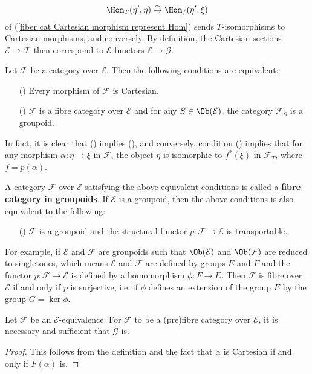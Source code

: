 \[\Hom_T(\eta',\eta)\stackrel{\sim}{\to }\Hom_f(\eta',\xi)\]
of (\ref{fiber cat Cartesian morphism represent Hom}) sends $T$-isomorphisms to Cartesian morphisms, and conversely. By definition, the Cartesian sections $\mathcal{E}\to \mathcal{F}$ then correspond to $\mathcal{E}$-functors $\mathcal{E}\to \mathcal{G}$.
\begin{example}\label{fibre cat in groupoid example}
Let $\mathcal{F}$ be a category over $\mathcal{E}$. Then the following conditions are equivalent:
\begin{enumerate}
\item[(\rmnum{1})] Every morphism of $\mathcal{F}$ is Cartesian.
\item[(\rmnum{2})] $\mathcal{F}$ is a fibre category over $\mathcal{E}$ and for any $S\in\Ob(\mathcal{E})$, the category $\mathcal{F}_S$ is a groupoid.
\end{enumerate}
In fact, it is clear that () implies (), and conversely, condition () implies that for any morphism $\alpha:\eta\to \xi$ in $\mathcal{F}$, the object $\eta$ is isomorphic to $f^*(\xi)$ in $\mathcal{F}_T$, where $f=p(\alpha)$.\par
A category $\mathcal{F}$ over $\mathcal{E}$ satisfying the above equivalent conditions is called a \textbf{fibre category in groupoids}. If $\mathcal{E}$ is a groupoid, then the above conditions is also equivalent to the following:
\begin{enumerate}
\item[(\rmnum{3})] $\mathcal{F}$ is a groupoid and the structural functor $p:\mathcal{F}\to \mathcal{E}$ is transportable. 
\end{enumerate}
For example, if $\mathcal{E}$ and $\mathcal{F}$ are groupoids such that $\Ob(\mathcal{E})$ and $\Ob(\mathcal{F})$ are reduced to singletones, which means $\mathcal{E}$ and $\mathcal{F}$ are defined by groups $E$ and $F$ and the functor $p:\mathcal{F}\to \mathcal{E}$ is defined by a homomorphism $\phi:F\to E$. Then $\mathcal{F}$ is fibre over $\mathcal{E}$ if and only if $p$ is surjective, i.e. if $\phi$ defines an extension of the group $E$ by the group $G=\ker\phi$. 
\end{example}
\begin{proposition}\label{fibre cat E-equivalence invariant}
Let $\mathcal{F}$ be an $\mathcal{E}$-equivalence. For $\mathcal{F}$ to be a (pre)fibre category over $\mathcal{E}$, it is necessary and sufficient that $\mathcal{G}$ is.
\end{proposition}
\begin{proof}
This follows from the definition and the fact that $\alpha$ is Cartesian if and only if $F(\alpha)$ is.
\end{proof}
